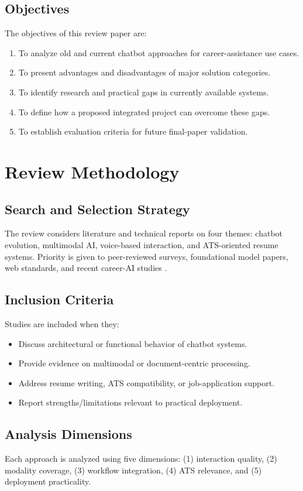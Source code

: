 \documentclass[conference]{IEEEtran}
\begin{document}
\subsection{Objectives}
The objectives of this review paper are:
\begin{enumerate}
    \item To analyze old and current chatbot approaches for career-assistance use cases.
    \item To present advantages and disadvantages of major solution categories.
    \item To identify research and practical gaps in currently available systems.
    \item To define how a proposed integrated project can overcome these gaps.
    \item To establish evaluation criteria for future final-paper validation.
\end{enumerate}

\section{Review Methodology}
\subsection{Search and Selection Strategy}
The review considers literature and technical reports on four themes: chatbot evolution, multimodal AI, voice-based interaction, and ATS-oriented resume systems. Priority is given to peer-reviewed surveys, foundational model papers, web standards, and recent career-AI studies \cite{thoppilan2022,w3c2023,atsllm2024}.

\subsection{Inclusion Criteria}
Studies are included when they:
\begin{itemize}
    \item Discuss architectural or functional behavior of chatbot systems.
    \item Provide evidence on multimodal or document-centric processing.
    \item Address resume writing, ATS compatibility, or job-application support.
    \item Report strengths/limitations relevant to practical deployment.
\end{itemize}

\subsection{Analysis Dimensions}
Each approach is analyzed using five dimensions: (1) interaction quality, (2) modality coverage, (3) workflow integration, (4) ATS relevance, and (5) deployment practicality.
\end{document}
